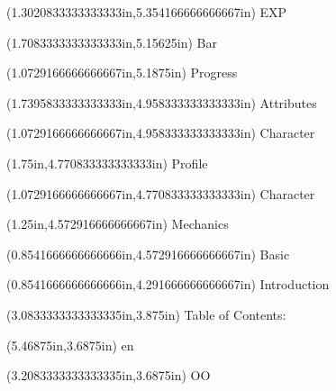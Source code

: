 \documentclass{article}
\begin{document}
\begin{textblock*}{8.0in}(1.3020833333333333in,5.354166666666667in)
\fontsize{10.50}{12.60}\selectfont
EXP
\end{textblock*}
\begin{textblock*}{8.0in}(1.7083333333333333in,5.15625in)
\fontsize{10.50}{12.60}\selectfont
Bar
\end{textblock*}
\begin{textblock*}{8.0in}(1.0729166666666667in,5.1875in)
\fontsize{12.75}{15.30}\selectfont
Progress
\end{textblock*}
\begin{textblock*}{8.0in}(1.7395833333333333in,4.958333333333333in)
\fontsize{10.50}{12.60}\selectfont
Attributes
\end{textblock*}
\begin{textblock*}{8.0in}(1.0729166666666667in,4.958333333333333in)
\fontsize{10.50}{12.60}\selectfont
Character
\end{textblock*}
\begin{textblock*}{8.0in}(1.75in,4.770833333333333in)
\fontsize{10.50}{12.60}\selectfont
Profile
\end{textblock*}
\begin{textblock*}{8.0in}(1.0729166666666667in,4.770833333333333in)
\fontsize{10.50}{12.60}\selectfont
Character
\end{textblock*}
\begin{textblock*}{8.0in}(1.25in,4.572916666666667in)
\fontsize{10.50}{12.60}\selectfont
Mechanics
\end{textblock*}
\begin{textblock*}{8.0in}(0.8541666666666666in,4.572916666666667in)
\fontsize{10.50}{12.60}\selectfont
Basic
\end{textblock*}
\begin{textblock*}{8.0in}(0.8541666666666666in,4.291666666666667in)
\fontsize{10.50}{12.60}\selectfont
Introduction
\end{textblock*}
\begin{textblock*}{8.0in}(3.0833333333333335in,3.875in)
\fontsize{11.25}{13.50}\selectfont
Table of Contents:
\end{textblock*}
\begin{textblock*}{8.0in}(5.46875in,3.6875in)
\fontsize{3.00}{3.60}\selectfont
en
\end{textblock*}
\begin{textblock*}{8.0in}(3.2083333333333335in,3.6875in)
\fontsize{3.00}{3.60}\selectfont
OO
\end{textblock*}
\end{document}
